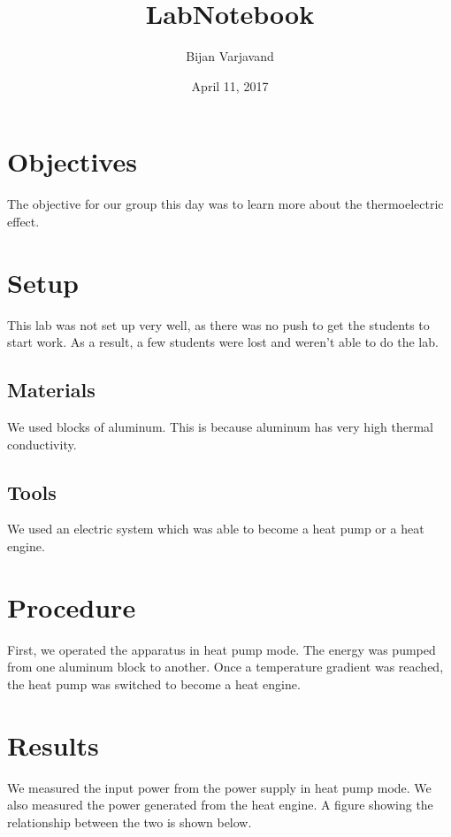 \documentclass{article}
\author{Bijan Varjavand}
\title{LabNotebook}
\date{April 11, 2017}
\begin{document}
\maketitle

\section{Objectives}

The objective for our group this day was to learn more about the thermoelectric effect.

\section{Setup}

This lab was not set up very well, as there was no push to get the students to start work. As a result, a few students were lost and weren't able to do the lab.

\subsection{Materials}

We used blocks of aluminum. This is because aluminum has very high thermal conductivity.

\subsection{Tools}

We used an electric system which was able to become a heat pump or a heat engine.

\section{Procedure}

First, we operated the apparatus in heat pump mode. The energy was pumped from one aluminum block to another. Once a temperature gradient was reached, the heat pump was switched to become a heat engine.

\section{Results}

We measured the input power from the power supply in heat pump mode. We also measured the power generated from the heat engine. A figure showing the relationship between the two is shown below.
\end{document}
